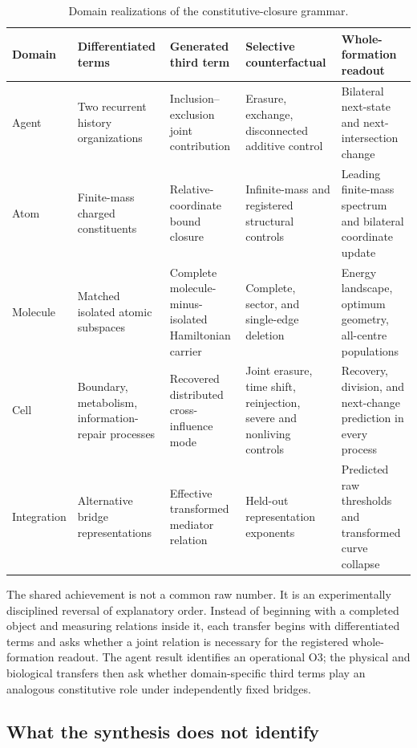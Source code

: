 \documentclass[11pt,a4paper]{article}
\begin{document}
\begin{table}[H]
\centering
\scriptsize
\caption{Domain realizations of the constitutive-closure grammar.}
\label{tab:cross-domain-map}
\begin{tabularx}{\textwidth}{@{}>{\raggedright\arraybackslash}p{1.45cm}>{\raggedright\arraybackslash}p{3.05cm}>{\raggedright\arraybackslash}p{3.25cm}>{\raggedright\arraybackslash}p{3.25cm}>{\raggedright\arraybackslash}X@{}}
\toprule
Domain & Differentiated terms & Generated third term & Selective counterfactual & Whole-formation readout \\
\midrule
Agent & Two recurrent history organizations & Inclusion--exclusion joint contribution & Erasure, exchange, disconnected additive control & Bilateral next-state and next-intersection change \\
Atom & Finite-mass charged constituents & Relative-coordinate bound closure & Infinite-mass and registered structural controls & Leading finite-mass spectrum and bilateral coordinate update \\
Molecule & Matched isolated atomic subspaces & Complete molecule-minus-isolated Hamiltonian carrier & Complete, sector, and single-edge deletion & Energy landscape, optimum geometry, all-centre populations \\
Cell & Boundary, metabolism, information-repair processes & Recovered distributed cross-influence mode & Joint erasure, time shift, reinjection, severe and nonliving controls & Recovery, division, and next-change prediction in every process \\
Integration & Alternative bridge representations & Effective transformed mediator relation & Held-out representation exponents & Predicted raw thresholds and transformed curve collapse \\
\bottomrule
\end{tabularx}
\end{table}

The shared achievement is not a common raw number. It is an experimentally disciplined reversal of explanatory order. Instead of beginning with a completed object and measuring relations inside it, each transfer begins with differentiated terms and asks whether a joint relation is necessary for the registered whole-formation readout. The agent result identifies an operational O3; the physical and biological transfers then ask whether domain-specific third terms play an analogous constitutive role under independently fixed bridges.

\subsection{What the synthesis does not identify}
\end{document}
